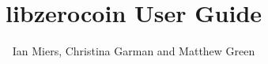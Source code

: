 \documentclass[12pt]{article}
\begin{document}
\newcommand{\libzerocoin}{\textsf{libzerocoin}}

\title{libzerocoin User Guide}
\author{Ian Miers, Christina Garman and Matthew Green}
\date{}
\maketitle



\end{document}
